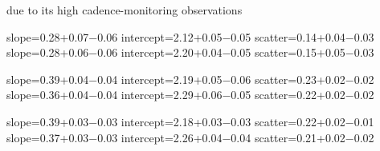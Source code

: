 
due to its high cadence-monitoring observations


slope=0.28+0.07−0.06 
intercept=2.12+0.05−0.05 
scatter=0.14+0.04−0.03
slope=0.28+0.06−0.06 
intercept=2.20+0.04−0.05 
scatter=0.15+0.05−0.03

slope=0.39+0.04−0.04 
intercept=2.19+0.05−0.06
scatter=0.23+0.02−0.02
slope=0.36+0.04−0.04 
intercept=2.29+0.06−0.05
scatter=0.22+0.02−0.02

slope=0.39+0.03−0.03 
intercept=2.18+0.03−0.03 
scatter=0.22+0.02−0.01
slope=0.37+0.03−0.03 
intercept=2.26+0.04−0.04
scatter=0.21+0.02−0.02

